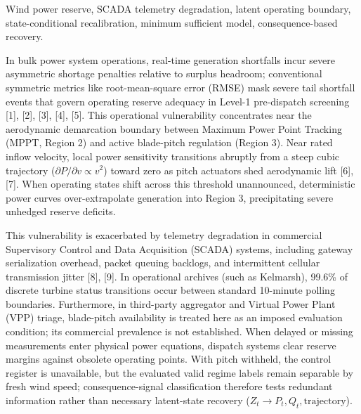 \documentclass[
  journal]{IEEEtran}
\makeatletter
\def\section{\@startsection{section}{1}{\z@}{0.75ex plus 0.15ex minus 0.1ex}{0.25ex plus 0.08ex}{\normalfont\footnotesize\bfseries\centering\scshape}}
\makeatother
\begin{document}
\begin{abstract}
\end{abstract}

\begin{IEEEkeywords}
Wind power reserve, SCADA telemetry degradation, latent operating boundary, state-conditional recalibration, minimum sufficient model, consequence-based recovery.
\end{IEEEkeywords}

\section{Introduction}\label{introduction}

In bulk power system operations, real-time generation shortfalls incur
severe asymmetric shortage penalties relative to surplus headroom;
conventional symmetric metrics like root-mean-square error (RMSE) mask
severe tail shortfall events that govern operating reserve adequacy in
Level-1 pre-dispatch screening {[}1{]}, {[}2{]}, {[}3{]}, {[}4{]},
{[}5{]}. This operational vulnerability concentrates near the
aerodynamic demarcation boundary between Maximum Power Point Tracking
(MPPT, Region 2) and active blade-pitch regulation (Region 3). Near
rated inflow velocity, local power sensitivity transitions abruptly from
a steep cubic trajectory (\(\partial P / \partial v \propto v^2\))
toward zero as pitch actuators shed aerodynamic lift {[}6{]}, {[}7{]}.
When operating states shift across this threshold unannounced,
deterministic power curves over-extrapolate generation into Region 3,
precipitating severe unhedged reserve deficits.

This vulnerability is exacerbated by telemetry degradation in commercial
Supervisory Control and Data Acquisition (SCADA) systems, including
gateway serialization overhead, packet queuing backlogs, and
intermittent cellular transmission jitter {[}8{]}, {[}9{]}. In
operational archives (such as Kelmarsh), 99.6\% of discrete turbine
status transitions occur between standard 10-minute polling boundaries.
Furthermore, in third-party aggregator and Virtual Power Plant (VPP)
triage, blade-pitch availability is treated here as an imposed
evaluation condition; its commercial prevalence is not established. When
delayed or missing measurements enter physical power equations, dispatch
systems clear reserve margins against obsolete operating points. With
pitch withheld, the control register is unavailable, but the evaluated
valid regime labels remain separable by fresh wind speed;
consequence-signal classification therefore tests redundant information
rather than necessary latent-state recovery
(\(Z_t \to P_t, Q_t, \text{trajectory}\)).
\end{document}
